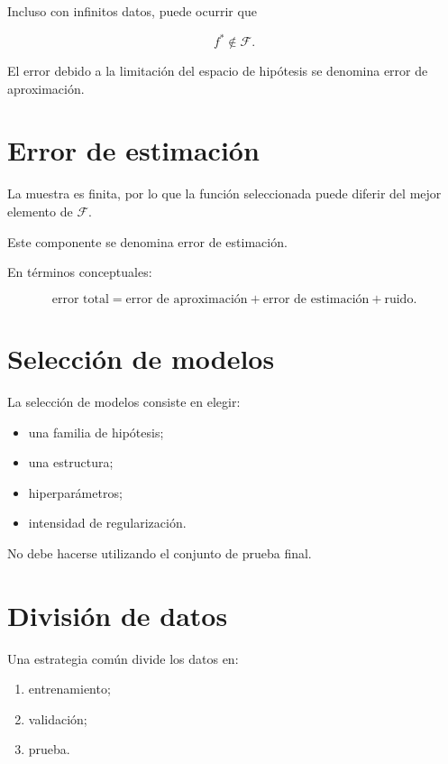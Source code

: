 \documentclass[
  spanish,
  11pt,
  letterpaper,
  DIV=11,
  numbers=noendperiod]{scrreprt}
\providecommand{\tightlist}{%
  \setlength{\itemsep}{0pt}\setlength{\parskip}{0pt}}
\theoremstyle{definition}
\theoremstyle{plain}
\theoremstyle{definition}
\theoremstyle{remark}
\begin{document}
Incluso con infinitos datos, puede ocurrir que

\[
f^{*}\notin\mathcal{F}.
\]

El error debido a la limitación del espacio de hipótesis se denomina
error de aproximación.

\section{Error de estimación}\label{error-de-estimaciuxf3n}

La muestra es finita, por lo que la función seleccionada puede diferir
del mejor elemento de \(\mathcal{F}\).

Este componente se denomina error de estimación.

En términos conceptuales:

\[
\text{error total}
=
\text{error de aproximación}
+
\text{error de estimación}
+
\text{ruido}.
\]

\section{Selección de modelos}\label{selecciuxf3n-de-modelos}

La selección de modelos consiste en elegir:

\begin{itemize}
\tightlist
\item
  una familia de hipótesis;
\item
  una estructura;
\item
  hiperparámetros;
\item
  intensidad de regularización.
\end{itemize}

No debe hacerse utilizando el conjunto de prueba final.

\section{División de datos}\label{divisiuxf3n-de-datos}

Una estrategia común divide los datos en:

\begin{enumerate}
\def\labelenumi{\arabic{enumi}.}
\tightlist
\item
  entrenamiento;
\item
  validación;
\item
  prueba.
\end{enumerate}
\end{document}
